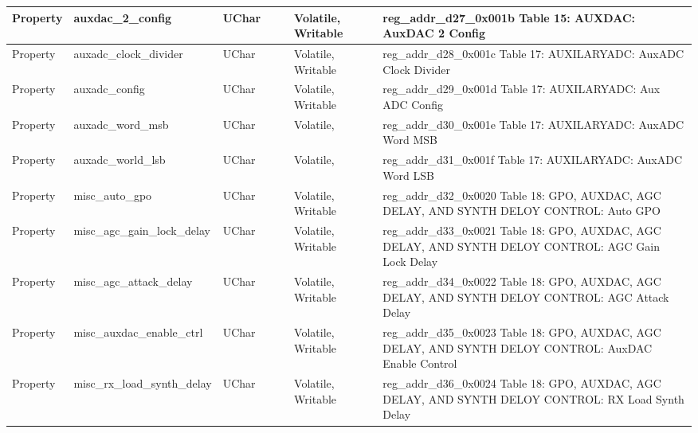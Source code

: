 \documentclass{article}
\begin{document}
\begin{scriptsize}
\begin{longtable}{|p{2cm}|p{5cm}|p{1cm}|p{2cm}|p{2cm}|p{1.75cm}|p{1.5cm}|p{5.1cm}|}
  \hline
  Property & auxdac\_2\_config                                        & UChar &                  &                  & Volatile,  Writable &         & reg\_addr\_d27\_0x001b  Table 15: AUXDAC: AuxDAC 2 Config \\
  \hline
  Property & auxadc\_clock\_divider                                   & UChar &                  &                  & Volatile,  Writable &         & reg\_addr\_d28\_0x001c  Table 17: AUXILARYADC: AuxADC Clock Divider \\
  \hline
  Property & auxadc\_config                                           & UChar &                  &                  & Volatile,  Writable &         & reg\_addr\_d29\_0x001d  Table 17: AUXILARYADC: Aux ADC Config \\
  \hline
  Property & auxadc\_word\_msb                                        & UChar &                  &                  & Volatile,           &         & reg\_addr\_d30\_0x001e  Table 17: AUXILARYADC: AuxADC Word MSB \\
  \hline
  Property & auxadc\_world\_lsb                                       & UChar &                  &                  & Volatile,           &         & reg\_addr\_d31\_0x001f  Table 17: AUXILARYADC: AuxADC Word LSB \\
  \hline
  Property & misc\_auto\_gpo                                          & UChar &                  &                  & Volatile,  Writable &         & reg\_addr\_d32\_0x0020  Table 18: GPO, AUXDAC, AGC DELAY, AND SYNTH DELOY CONTROL: Auto GPO \\
  \hline
  Property & misc\_agc\_gain\_lock\_delay                             & UChar &                  &                  & Volatile,  Writable &         & reg\_addr\_d33\_0x0021  Table 18: GPO, AUXDAC, AGC DELAY, AND SYNTH DELOY CONTROL: AGC Gain Lock Delay \\
  \hline
  Property & misc\_agc\_attack\_delay                                 & UChar &                  &                  & Volatile,  Writable &         & reg\_addr\_d34\_0x0022  Table 18: GPO, AUXDAC, AGC DELAY, AND SYNTH DELOY CONTROL: AGC Attack Delay \\
  \hline
  Property & misc\_auxdac\_enable\_ctrl                               & UChar &                  &                  & Volatile,  Writable &         & reg\_addr\_d35\_0x0023  Table 18: GPO, AUXDAC, AGC DELAY, AND SYNTH DELOY CONTROL: AuxDAC Enable Control \\
  \hline
  Property & misc\_rx\_load\_synth\_delay                             & UChar &                  &                  & Volatile,  Writable &         & reg\_addr\_d36\_0x0024  Table 18: GPO, AUXDAC, AGC DELAY, AND SYNTH DELOY CONTROL: RX Load Synth Delay \\

\end{longtable}
\end{scriptsize}
\end{document}
